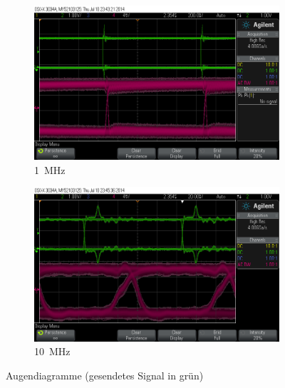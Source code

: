 \documentclass[12pt,a4paper]{article}
\begin{document}
\begin{figure}[H]
  \centering
  \begin{subfigure}[b]{0.6\textwidth}
    \includegraphics[width=\textwidth]{../measurements/20140710/eye_plots/01MHz.png}
    \caption{\SI{1}{\mega\hertz}}
    \label{fig:eye_plots_slow_1M}
  \end{subfigure}  
  \begin{subfigure}[b]{0.6\textwidth}
    \includegraphics[width=\textwidth]{../measurements/20140710/eye_plots/10MHz.png}
    \caption{\SI{10}{\mega\hertz}}
    \label{fig:eye_plots_slow_10M}
  \end{subfigure}  
  \caption{Augendiagramme (gesendetes Signal in grün)}
  \label{fig:eye_plots_slow}
\end{figure}
\end{document}
